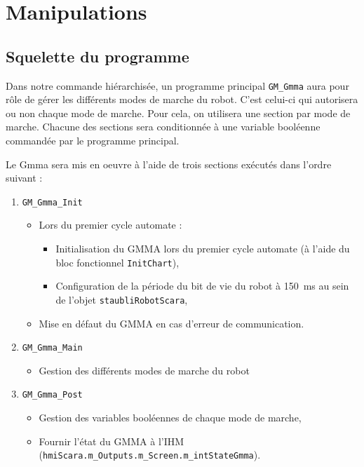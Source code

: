 \section{Manipulations}
\label{sec:manipulations}
\subsection{Squelette du programme}
\label{subsect:squelette_du_programme}

Dans notre commande hiérarchisée, un programme principal \texttt{GM\_Gmma} aura pour rôle de gérer les différents modes de marche du robot. C'est celui-ci qui autorisera ou non chaque mode de marche. Pour cela, on utilisera une section par mode de marche. Chacune des sections sera conditionnée à une variable booléenne commandée par le programme principal.

Le Gmma sera mis en oeuvre à l'aide de trois sections exécutés dans l'ordre suivant :
\begin{enumerate}
    \item \texttt{GM\_Gmma\_Init}
          \begin{itemize}
              \item Lors du premier cycle automate :
                    \begin{itemize}
                        \item Initialisation du GMMA lors du premier cycle automate (à l'aide du bloc fonctionnel \texttt{InitChart}),
                        \item Configuration de la période du bit de vie du robot à \SI{150}{ms} au sein de l'objet \texttt{staubliRobotScara},
                    \end{itemize}
              \item Mise en défaut du GMMA en cas d'erreur de communication.
          \end{itemize}
    \item \texttt{GM\_Gmma\_Main}
          \begin{itemize}
              \item Gestion des différents modes de marche du robot
          \end{itemize}
    \item \texttt{GM\_Gmma\_Post}
          \begin{itemize}
              \item Gestion des variables booléennes de chaque mode de marche,
              \item Fournir l'état du GMMA à l'IHM (\texttt{hmiScara.m\_Outputs.m\_Screen.m\_intStateGmma}).
          \end{itemize}
\end{enumerate}

